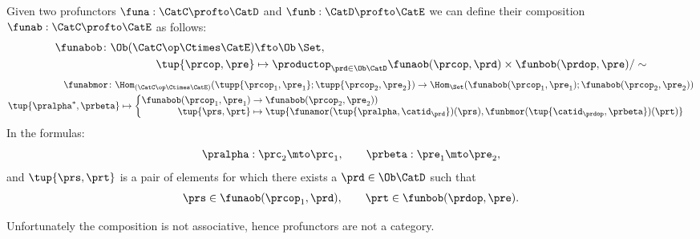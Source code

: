 \begin{widepar}
\begin{ctdefinition}
  \label{def:profunctor-composition}
  Given two profunctors $\funa: \CatC \profto \CatD$ and $\funb: \CatD \profto \CatE$
  we can define their composition $\funab: \CatC \profto \CatE$ as follows:
  \begin{equation}
    \begin{aligned}
    \funabob \colon \Ob(\CatC\op \Ctimes \CatE) & \fto  \Ob\, \Set, \\
    \tup{\prcop, \pre} & \mapsto \productop_{\prd\in\Ob \CatD} \funaob(\prcop, \prd) \times \funbob(\prdop, \pre) / \sim
    \end{aligned}
  \end{equation}
  \begin{equation}
    \begin{aligned}
      \funabmor  \colon \Hom_{(\CatC\op \Ctimes \CatE)}( \tupp{\prcop_1, \pre_1}; \tupp{\prcop_2, \pre_2}) \to \Hom_{\Set}( \funabob(\prcop_1, \pre_1); \funabob(\prcop_2, \pre_2)) \\
      \tup{\pralpha^\ast, \prbeta} \mapsto  \begin{cases}
        \begin{aligned}
          \funabob(\prcop_1, \pre_1) & \to   \funabob(\prcop_2, \pre_2)) \\
          \tup{\prs, \prt} & \mapsto  \tup{
              \funamor(\tup{\pralpha, \catid_{\prd}})(\prs),
              \funbmor(\tup{\catid_{\prdop}, \prbeta})(\prt)}
        \end{aligned}
      \end{cases}
    \end{aligned}
  \end{equation}
  In the formulas:
\begin{equation}
  \pralpha: \prc_2 \mto \prc_1, \qquad
  \prbeta: \pre_1 \mto \pre_2,
\end{equation}
and $\tup{\prs, \prt}$ is a pair of elements for which there exists a $\prd\in\Ob \CatD$ such that \begin{equation}\prs \in \funaob(\prcop_1, \prd), \qquad\prt \in \funbob(\prdop, \pre).
\end{equation}


\end{ctdefinition}
\end{widepar}

Unfortunately the composition is not associative, hence profunctors are not a category.

 

